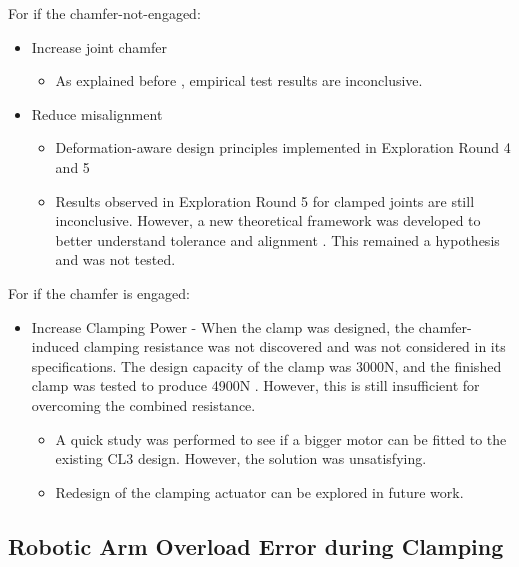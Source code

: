 For if the chamfer-not-engaged:
\begin{itemize}
    \item Increase joint chamfer
    \begin{itemize}
        \item As explained before , empirical test results are inconclusive.
    \end{itemize}
    \item Reduce misalignment 
    \begin{itemize}
        \item Deformation-aware design principles implemented in Exploration Round 4 and 5
        \item Results observed in Exploration Round 5 for clamped joints are still inconclusive. However, a new theoretical framework was developed to better understand tolerance and alignment . This remained a hypothesis and was not tested.
    \end{itemize}
\end{itemize}

For if the chamfer is engaged:
\begin{itemize}
    \item Increase Clamping Power - When the clamp was designed, the chamfer-induced clamping resistance was not discovered and was not considered in its specifications. The design capacity of the clamp was 3000N, and the finished clamp was tested to produce 4900N . However, this is still insufficient for overcoming the combined resistance.
    \begin{itemize}
        \item A quick study was performed to see if a bigger motor can be fitted to the existing CL3 design. However, the solution was unsatisfying.
        \item Redesign of the clamping actuator can be explored in future work.
    \end{itemize}
\end{itemize}

\subsection{Robotic Arm Overload Error during Clamping}
\label{subsection:exploration-2-robotic-arm-overload-error-during-clamping}

